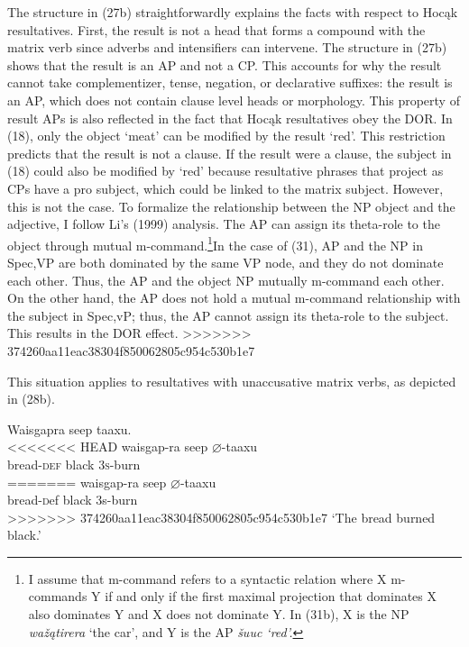 \documentclass[output=paper]{LSP/langsci}
\begin{document}
\begin{exe}
\begin{exe}
\begin{exe}
\begin{exe}
{\begin{exe}
The structure in (27b) straightforwardly explains the facts with respect to Hoc\k{a}k resultatives. First, the result is not a head that forms a compound with the matrix verb since adverbs and intensifiers can intervene. The structure in (27b) shows that the result is an AP and not a CP. This accounts for why the result cannot take complementizer, tense, negation, or declarative suffixes: the result is an AP, which does not contain clause level heads or morphology. This property of result APs is also reflected in the fact that Hoc\k{a}k resultatives obey the DOR. In (18), only the object `meat' can be modified by the result `red'. This restriction predicts that the result is not a clause. If the result were a clause, the subject in (18) could also be modified by `red' because resultative phrases that project as CPs have a pro subject, which could be linked to the matrix subject. However, this is not the case. To formalize the relationship between the NP object and the adjective, I follow Li's (1999) analysis. The AP can assign its theta-role to the object through mutual m-command.\footnote{I assume that m-command refers to a syntactic relation where X m-commands Y if and only if the first maximal projection that dominates X also dominates Y and X does not dominate Y. In (31b), X is the NP \textit{wa\v{z}\k{a}tirera} `the car', and Y is the AP \textit{\v{s}uuc `red'.}}In the case of (31), AP and the NP in Spec,VP are both dominated by the same VP node, and they do not dominate each other. Thus, the AP and the object NP mutually m-command each other. On the other hand, the AP does not hold a mutual m-command relationship with the subject in Spec,vP; thus, the AP cannot assign its theta-role to the subject. This results in the DOR effect.
>>>>>>> 374260aa11eac38304f850062805c954c530b1e7

This situation applies to resultatives with unaccusative matrix verbs, as depicted in (28b).

\begin{exe}
\ex
\begin{xlist}

\ex \glll Waisgapra seep {taaxu}.\\
<<<<<<< HEAD
 waisgap-ra seep {$\varnothing$}-taaxu\\
bread-\textsc{def} black \textsc{3s}-burn\\
=======
 waisgap-ra seep $\varnothing$-taaxu\\
bread-{\textsc def} black {\textsc 3s}-burn\\
>>>>>>> 374260aa11eac38304f850062805c954c530b1e7
\glt `The bread burned black.'



\end{xlist}
\end{exe}
\end{exe}}
\end{exe}
\end{exe}
\end{exe}
\end{exe}
\end{document}
